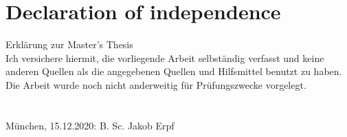 \documentclass[a4paper,12pt]{report}
\begin{document}
\chapter*{Declaration of independence}
Erklärung zur Master’s Thesis
\newline \\
Ich versichere hiermit, die vorliegende Arbeit selbständig verfasst und keine anderen Quellen als die angegebenen Quellen und Hilfsmittel benutzt zu haben. Die Arbeit wurde noch nicht anderweitig für Prüfungszwecke vorgelegt. 
\newline \\ \\ \\
München, 15.12.2020: \hrulefill \newline
\hspace*{0mm}\phantom{München, 15.12.2020: } B. Sc. Jakob Erpf
\end{document}
